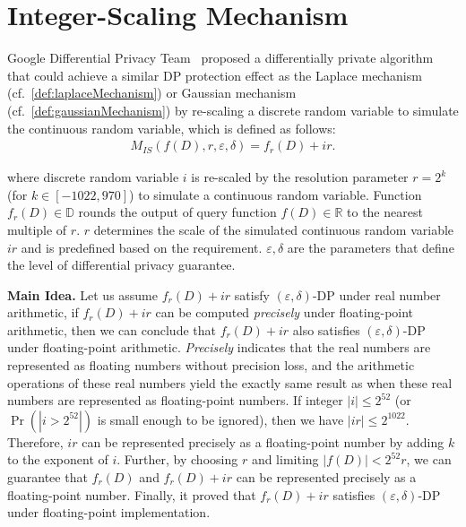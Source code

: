 

\section{Integer-Scaling Mechanism}
\label{sec:integerScalingMechanism}
Google Differential Privacy Team~\cite{googleDP2019} proposed a differentially private algorithm that could achieve a similar DP protection effect as the Laplace mechanism (cf.~\autoref{def:laplaceMechanism}) or Gaussian mechanism (cf.~\autoref{def:gaussianMechanism}) by re-scaling a discrete random variable to simulate the continuous random variable, which is defined as follows:
\begin{equation}
    \begin{split}
        M_{IS}\left(f\left(D\right),r, \varepsilon, \delta \right)=f_r\left(D\right) +ir.
    \end{split}
\end{equation}

where discrete random variable $i $ is re-scaled by the resolution parameter $r=2^k$ (for $k \in \left[-1022,970\right] $) to simulate a continuous random variable.
Function $f_r\left(D\right)\in\mathbb{D} $ rounds the output of query function $f\left(D\right)\in\mathbb{R} $ to the nearest multiple of $r$.
$r$ determines the scale of the simulated continuous random variable $ir$ and is predefined based on the requirement.
$\varepsilon, \delta$ are the parameters that define the level of differential privacy guarantee.

\textbf{Main Idea.} Let us assume $f_r\left(D\right) +ir$ satisfy $\left(\varepsilon, \delta\right) $-DP under real number arithmetic, if $f_r\left(D\right) +ir$ can be computed \textit{precisely} under floating-point arithmetic, then we can conclude that $f_r\left(D\right) +ir$ also satisfies $\left(\varepsilon, \delta\right) $-DP under floating-point arithmetic. \textit{Precisely} indicates that the real numbers are represented as floating numbers without precision loss, and the arithmetic operations of these real numbers yield the exactly same result as when these real numbers are represented as floating-point numbers.
If integer $\left\lvert i\right\rvert \leq2^{52}$ (or $\Pr\left(\left\lvert i>2^{52}\right\rvert \right) $ is small enough to be ignored), then we have $    \left\lvert ir\right\rvert  \leq 2^{1022}$. Therefore, $ir$ can be represented precisely as a floating-point number by adding $k$ to the exponent of $i$. Further, by choosing $r$ and limiting $\left\lvert f\left(D\right)\right\rvert< 2^{52}r  $, we can guarantee that $f_r\left(D\right) $ and $f_r\left(D\right)+ir$ can be represented precisely as a floating-point number.
Finally, it proved that $f_r\left(D\right) +ir$ satisfies $\left(\varepsilon, \delta\right)$-DP under floating-point implementation.

